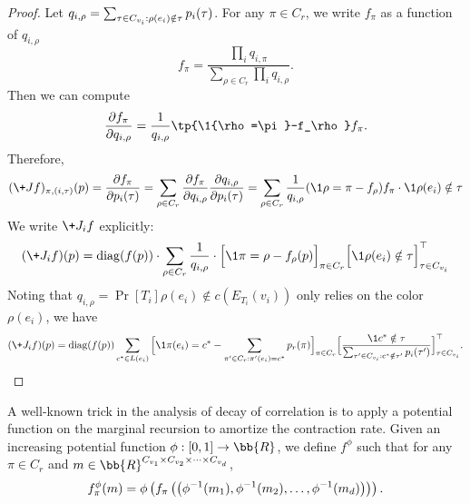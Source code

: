 \begin{proof}
    Let $q_{i,\rho}=\sum_{\tau
    \in C_{v_i}: \rho(e_i)\notin \tau} \*p_{i}(\tau)$.
    For any $\pi \in C_r$, we write $f_\pi$ as a function of $q_{i,\rho}$ 
    \begin{equation*}
        f_\pi = \frac{\prod_i q_{i,\pi}}{\sum_{\rho \in C_r} \prod_i q_{i,\rho}}.
    \end{equation*}
    Then we can compute
    \begin{equation*}
        \frac{\partial f_\pi}{\partial q_{i,\rho}} = \frac{1}{q_{i, \rho}}\tp{\1{\rho=\pi}-f_\rho}f_\pi.
    \end{equation*}
    Therefore,
    \begin{equation*}
          (\+J f)_{\pi,(i,\tau)}(\*p)=\frac{\partial f_\pi}{\partial \*p_i(\tau)}=\sum_{\rho\in C_r} \frac{\partial f_\pi}{\partial q_{i,\rho}} \frac{\partial q_{i,\rho}}{\partial \*p_i(\tau)}
         =\sum_{\rho\in C_r}\frac{1}{q_{i, \rho}}(\1{\rho=\pi}-f_\rho)f_\pi\cdot \1{\rho(e_i)\notin \tau}
    \end{equation*}
We write $\+J_i f$ explicitly:
\begin{align*}
(\+J_i f)(\*p)%
=\operatorname{diag}(f(\*p))\cdot\sum_{\rho \in C_r}\frac{1}{q_{i,\rho}}\cdot\Big[\1{\pi=\rho}-f_\rho(\*p)\Big]_{\pi \in C_r} \Big[\1{\rho(e_i)\notin \tau}\Big]_{\tau\in C_{v_i}}^\top
\end{align*}
Noting that $q_{i,\rho}=\Pr[T_i]{\rho(e_i)\notin c(E_{T_i}(v_i))}$ only relies on the color $\rho(e_i)$, we have
\begin{align*}
    (\+J_i f)(\*p) = \operatorname{diag}(f(\*p))\sum_{c^*\in L({e_i})} \Big[\1{\pi(e_i)=c^*}-\sum_{\pi' \in C_{r} :\pi'(e_i)=c^*}\*p_r(\pi)\Big]_{\pi \in C_r}\Big[\frac{\1{c^*\notin \tau}}{\sum_{\tau' \in C_{v_i} :c^*\notin \tau'}\*p_i(\tau')}\Big]_{\tau\in C_{v_i}}^\top.
\end{align*}
\end{proof}

A well-known trick in the analysis of decay of correlation is to apply a potential function on the marginal recursion to amortize the contraction rate. Given an increasing  potential function $\phi:[0,1]\rightarrow \bb{R}$, we define $f^\phi$ such that for any $\pi \in C_r$ and $\*m \in \bb{R}^{C_{v_1}\times C_{v_2}\times \dots \times C_{v_d}}$,
\begin{equation*}
f^{\phi}_\pi(\*m)=\phi\left(f_\pi\left(\left(\phi^{-1}(\*m_{1}),\phi^{-1}(\*m_{2}),\dots, \phi^{-1}(\*m_{d})\right)\right)\right).
\end{equation*}

